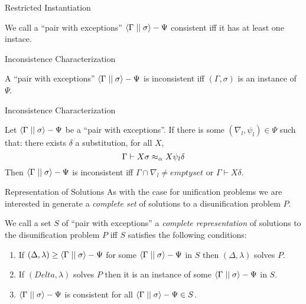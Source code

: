 \documentclass{beamer}
\begin{document}
    \begin{frame}{Restricted Instantiation}
        \begin{definition}
            We call a ``pair with exceptions'' $\left\langle \Gamma \mid\mid \sigma \right\rangle - \Psi$ consistent iff it has at least one instace.
        \end{definition}
    \end{frame}

    \begin{frame}{Inconsistence Characterization}
        \begin{lemma}
            A ``pair with exceptions'' $\left\langle \Gamma \mid\mid \sigma \right\rangle - \Psi$ is inconsistent iff $(\Gamma, \sigma)$ is an instance of $\Psi$.
        \end{lemma}
    \end{frame}

    \begin{frame}{Inconsistence Characterization}
        \begin{corollary}
            Let $\left\langle \Gamma \mid\mid \sigma \right\rangle - \Psi$ be a ``pair with exceptions''. If there is some $(\nabla_l, \psi_l) \in \Psi$ such that: there exists $\delta$ a substitution, for all $X$,
            $$\Gamma \vdash X\sigma \mathrel{\approx_\alpha} X \psi_l\delta$$
            Then $\left\langle \Gamma \mid\mid \sigma \right\rangle - \Psi$ is inconsistent iff $\Gamma \cap \nabla_l \neq emptyset$ or $\Gamma \vdash X\delta$.
        \end{corollary}
    \end{frame}

    \begin{frame}{Representation of Solutions}
        As with the case for unification problems we are interested in generate a \textit{complete set} of solutions to a disunification problem $P$.
        \begin{definition}
            We call a set $S$ of ``pair with exceptions'' a \textit{complete representation} of solutions to the disunification problem $P$ iff $S$ satisfies the following conditions:
            \begin{enumerate}
                \item If $(\Delta, \lambda) \geq \left\langle \Gamma \mid\mid \sigma \right\rangle - \Psi$ for some $\left\langle \Gamma \mid\mid \sigma \right\rangle - \Psi$ in $S$ then $(\Delta, \lambda)$ solves $P$.
                \item If $(Delta, \lambda)$ solves $P$ then it is an instance of some $\left\langle \Gamma \mid\mid \sigma \right\rangle - \Psi$ in $S$.
                \item $\left\langle \Gamma \mid\mid \sigma \right\rangle - \Psi$ is consistent for all $\left\langle \Gamma \mid\mid \sigma \right\rangle - \Psi \in S$.
            \end{enumerate}
        \end{definition}
    \end{frame}
\end{document}
